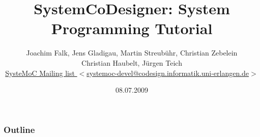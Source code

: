 {
}

{
\usenavigationsymbolstemplate{} %

}


\usepackage[utf8]{inputenc}
\usepackage{pslatex}
\usepackage{graphicx}

\usepackage{listings}
\lstset{language=C++,showstringspaces=false,breaklines=true,basicstyle=\ttfamily}

{
\lstset{commentstyle=\scriptsize\selectfont}
\lstset{basicstyle=\scriptsize\ttfamily\selectfont}
}

\newcommand{\SysteMoC}{\emph{SysteMoC}}
\newcommand{\SystemCoDesigner}{\emph{SystemCoDesigner}}
\newcommand{\concat}{{}^{\smallfrown}}
\newcommand{\length}{\#}



\title{SystemCoDesigner: System Programming Tutorial}
\author[SCD Group]{Joachim Falk, Jens Gladigau, Martin Streubühr, Christian Zebelein\\ Christian Haubelt, Jürgen Teich\texorpdfstring{\\}{}
    {\tiny \href{mailto:systemoc-devel@codesign.informatik.uni-erlangen.de}{SysteMoC Mailing list $<$systemoc-devel@codesign.informatik.uni-erlangen.de$>$}}}
{
}
\date{08.07.2009}




\begin{frame}
  \titlepage
\end{frame}

\begin{frame}
  \frametitle{Outline}
  \tableofcontents
\end{frame}



